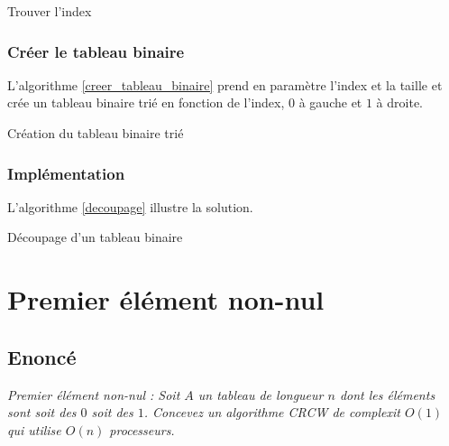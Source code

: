 \documentclass[oneside,11pt]{article}
\begin{document}
\begin{empfile}
\incmargin{1em}
\begin{algorithm}
  \label{index}
  \caption{Trouver l'index}
\end{algorithm}

\subsubsection{Créer le tableau binaire}

L'algorithme \ref{creer_tableau_binaire} prend en paramètre l'index et la taille et crée un tableau binaire trié en fonction de l'index, $0$ à gauche et $1$ à droite.

\incmargin{1em}
\begin{algorithm}
  \label{creer_tableau_binaire}
  \caption{Création du tableau binaire trié}
\end{algorithm}

\subsubsection{Implémentation}

L’algorithme \ref{decoupage} illustre la solution.

\incmargin{1em}
\begin{algorithm}
  \label{decoupage}
  \caption{Découpage d’un tableau binaire}
\end{algorithm}


\section{Premier élément non-nul}
\subsection{Enoncé}
\textit{Premier élément non-nul : Soit $A$ un tableau de longueur $n$ dont les éléments sont soit des $0$ soit des $1$. Concevez un algorithme CRCW de complexit $O(1)$ qui utilise $O(n)$ processeurs.}


\end{empfile}
\end{document}
